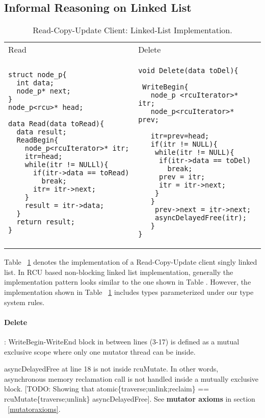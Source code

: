 \subsection{Informal Reasoning on Linked List}
\begin{table}[]
	\begin{tabular}{|p{7cm}|p{7cm}|}
		Read & Delete \\
		
\begin{lstlisting}
struct node_p{
  int data;
  node_p* next;
}		
node_p<rcu>* head;
	
data Read(data toRead){
  data result;	
  ReadBegin{
    node_p<rcuIterator>* itr; 
    itr=head;     
    while(itr != NULLl){
      if(itr->data == toRead)
	    break;
	  itr= itr->next;
    }
    result = itr->data;
  }
  return result;
}
		\end{lstlisting} &
		
		\begin{lstlisting}
void Delete(data toDel){

 WriteBegin{
   node_p <rcuIterator>* itr;
   node_p<rcuIterator>* prev;

   itr=prev=head;    
   if(itr != NULL){
    while(itr != NULL){
     if(itr->data == toDel)
       break;
     prev = itr;
     itr = itr->next;
    }
   }
    prev->next = itr->next;
    asyncDelayedFree(itr);
   }
}
		\end{lstlisting} 
	\end{tabular}
	
	\caption{Read-Copy-Update Client: Linked-List Implementation.}
	\label{tab:rculist}
\end{table}

Table ~\ref{tab:rculist} denotes the implementation of a \textsf{Read-Copy-Update} client singly linked list. 
In RCU based non-blocking linked list implementation, generally the implementation pattern looks similar to the one shown in Table . However, the implementation shown in Table ~\ref{tab:rculist} includes types parameterized under our type system rules.
\paragraph{Delete}  : \textsf{WriteBegin-WriteEnd} block in between lines (3-17) is defined as  a mutual exclusive scope where only one mutator thread can be inside. 

\textsf{asyncDelayedFree} at line 18 is not inside \textsf{rcuMutate}. In other words, asynchronous memory reclamation call is not handled inside a mutually exclusive block.  [TODO: Showing that atomic\{traverse;unlink;reclaim\} == rcuMutate\{traverse;unlink\} asyncDelayedFree]. See \textbf{mutator axioms} in section  ~\ref{mutatoraxioms}.

